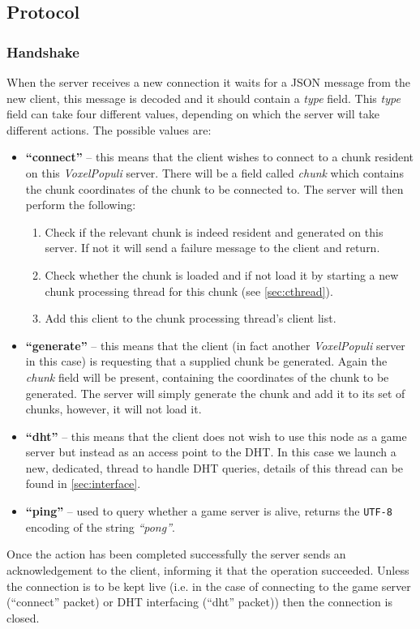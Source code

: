 \documentclass[12pt,notitlepage,a4paper]{report}
\newcommand{\voxpop}{\emph{VoxelPopuli}}
\begin{document}
	\subsection{Protocol}
	\subsubsection{Handshake}
	\label{sec:handshake}
	When the server receives a new connection it waits for a JSON message from the new client, this message is decoded and it should contain a \emph{type} field. This \emph{type} field can take four different values, depending on which the server will take different actions. The possible values are:
	\begin{itemize}
		\item \textbf{``connect''} -- this means that the client wishes to connect to a chunk resident on this \voxpop{} server. There will be a field called \emph{chunk} which contains the chunk coordinates of the chunk to be connected to. The server will then perform the following:
		\begin{enumerate}
			\item Check if the relevant chunk is indeed resident and generated on this server. If not it will send a failure message to the client and return.
			\item Check whether the chunk is loaded and if not load it by starting a new chunk processing thread for this chunk (see \cref{sec:cthread}).
			\item Add this client to the chunk processing thread's client list.
		\end{enumerate}
		\item \textbf{``generate''} -- this means that the client (in fact another \voxpop{} server in this case) is requesting that a supplied chunk be generated. Again the \emph{chunk} field will be present, containing the coordinates of the chunk to be generated. The server will simply generate the chunk and add it to its set of chunks, however, it will not load it.
		\item \textbf{``dht''} -- this means that the client does not wish to use this node as a game server but instead as an access point to the DHT. In this case we launch a new, dedicated, thread to handle DHT queries, details of this thread can be found in \cref{sec:interface}.
		\item \textbf{``ping''} -- used to query whether a game server is alive, returns the \texttt{UTF-8} encoding of the string \emph{``pong''}.
	\end{itemize}
	Once the action has been completed successfully the server sends an acknowledgement to the client, informing it that the operation succeeded. Unless the connection is to be kept live (i.e. in the case of connecting to the game server (``connect'' packet) or DHT interfacing (``dht'' packet)) then the connection is closed.
	
\end{document}
